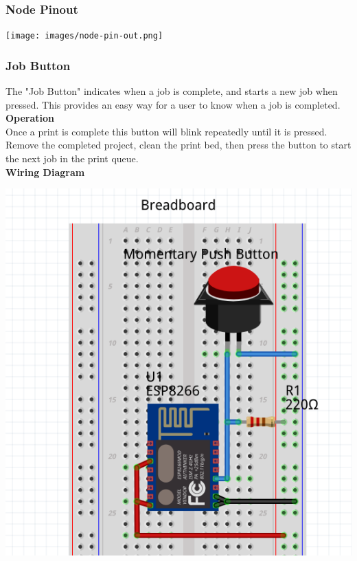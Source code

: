   \subsubsection{Node Pinout}
  \begin{center}
        \texttt{[image: images/node-pin-out.png]}
  \end{center}
    \subsubsection{Job Button}
      The "Job Button" indicates when a job is complete, and starts a new job when pressed. This provides an easy way
      for a user to know when a job is completed.\\

      \textbf{Operation}\\
      Once a print is complete this button will blink repeatedly until it is pressed.  Remove the completed project,
      clean the print bed, then press the button to start the next job in the print queue.\\

      \textbf{Wiring Diagram}\\
            \begin{center}
      \includegraphics[scale=0.25]{images/job-cir.png}
      \end{center}

